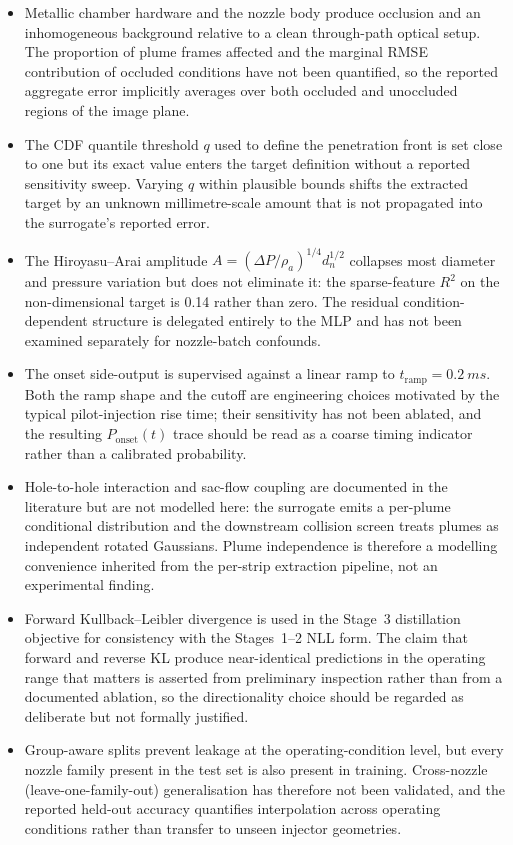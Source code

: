 \documentclass[english, 12pt, a4paper, elec, utf8, a-2b, online]{aaltothesis}
\begin{document}
\begin{itemize}
  \item Metallic chamber hardware and the nozzle body produce occlusion and an inhomogeneous background relative to a clean through-path optical setup. The proportion of plume frames affected and the marginal RMSE contribution of occluded conditions have not been quantified, so the reported aggregate error implicitly averages over both occluded and unoccluded regions of the image plane.
  \item The CDF quantile threshold $q$ used to define the penetration front is set close to one but its exact value enters the target definition without a reported sensitivity sweep. Varying $q$ within plausible bounds shifts the extracted target by an unknown millimetre-scale amount that is not propagated into the surrogate's reported error.
  \item The Hiroyasu--Arai amplitude $A=(\Delta P/\rho_a)^{1/4}d_n^{1/2}$ collapses most diameter and pressure variation but does not eliminate it: the sparse-feature $R^2$ on the non-dimensional target is 0.14 rather than zero. The residual condition-dependent structure is delegated entirely to the MLP and has not been examined separately for nozzle-batch confounds.
  \item The onset side-output is supervised against a linear ramp to $t_{\mathrm{ramp}}=\SI{0.2}{ms}$. Both the ramp shape and the cutoff are engineering choices motivated by the typical pilot-injection rise time; their sensitivity has not been ablated, and the resulting $P_{\mathrm{onset}}(t)$ trace should be read as a coarse timing indicator rather than a calibrated probability.
  \item Hole-to-hole interaction and sac-flow coupling are documented in the literature but are not modelled here: the surrogate emits a per-plume conditional distribution and the downstream collision screen treats plumes as independent rotated Gaussians. Plume independence is therefore a modelling convenience inherited from the per-strip extraction pipeline, not an experimental finding.
  \item Forward Kullback--Leibler divergence is used in the Stage~3 distillation objective for consistency with the Stages~1--2 NLL form. The claim that forward and reverse KL produce near-identical predictions in the operating range that matters is asserted from preliminary inspection rather than from a documented ablation, so the directionality choice should be regarded as deliberate but not formally justified.
  \item Group-aware splits prevent leakage at the operating-condition level, but every nozzle family present in the test set is also present in training. Cross-nozzle (leave-one-family-out) generalisation has therefore not been validated, and the reported held-out accuracy quantifies interpolation across operating conditions rather than transfer to unseen injector geometries.

\end{itemize}
\end{document}
